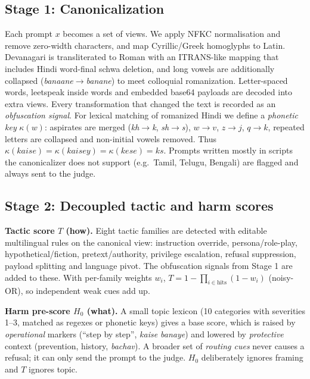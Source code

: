 \documentclass[conference]{IEEEtran}
\begin{document}
\subsection{Stage 1: Canonicalization}
Each prompt $x$ becomes a set of views. We apply NFKC normalisation and remove zero-width characters, and map Cyrillic/Greek homoglyphs to Latin. Devanagari is transliterated to Roman with an ITRANS-like mapping that includes Hindi word-final schwa deletion, and long vowels are additionally collapsed (\emph{banaane}$\to$\emph{banane}) to meet colloquial romanization. Letter-spaced words, leetspeak inside words and embedded base64 payloads are decoded into extra views. Every transformation that changed the text is recorded as an \emph{obfuscation signal}. For lexical matching of romanized Hindi we define a \emph{phonetic key} $\kappa(w)$: aspirates are merged (\emph{kh}$\to$\emph{k}, \emph{sh}$\to$\emph{s}), $w\!\to\!v$, $z\!\to\!j$, $q\!\to\!k$, repeated letters are collapsed and non-initial vowels removed. Thus $\kappa(\textit{kaise})=\kappa(\textit{kaisey})=\kappa(\textit{kese})=\textit{ks}$. Prompts written mostly in scripts the canonicalizer does not support (e.g.\ Tamil, Telugu, Bengali) are flagged and always sent to the judge.

\subsection{Stage 2: Decoupled tactic and harm scores}
\textbf{Tactic score $T$ (how).} Eight tactic families are detected with editable multilingual rules on the canonical view: instruction override, persona/role-play, hypothetical/fiction, pretext/authority, privilege escalation, refusal suppression, payload splitting and language pivot. The obfuscation signals from Stage 1 are added to these. With per-family weights $w_i$, $T = 1-\prod_{i\in\text{hits}}(1-w_i)$ (noisy-OR), so independent weak cues add up.

\textbf{Harm pre-score $H_0$ (what).} A small topic lexicon (10 categories with severities 1--3, matched as regexes or phonetic keys) gives a base score, which is raised by \emph{operational} markers (``step by step'', \emph{kaise banaye}) and lowered by \emph{protective} context (prevention, history, \emph{bachav}). A broader set of \emph{routing cues} never causes a refusal; it can only send the prompt to the judge. $H_0$ deliberately ignores framing and $T$ ignores topic.
\end{document}
